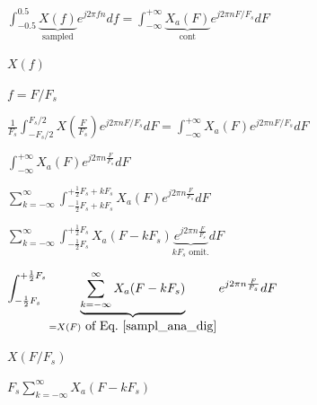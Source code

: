 \documentclass[12pt,a4paper]{article}
\def\lthtmlcheckvsize{\ifdim\ht\sizebox<\vsize 
  \ifdim\wd\sizebox<\hsize\expandafter\hfill\fi \expandafter\vfill
  \else\expandafter\vss\fi}%
\begin{document}
{\newpage\clearpage
{}%
$\displaystyle \int_{-0.5}^{0.5} \underbrace{X(f)}_{\mbox{sampled}} e^{j 2 \pi f n} df = 
\int_{-\infty}^{+\infty} \underbrace{X_a(F)}_{\mbox{cont}} e^{j 2\pi n F/F_s} dF
$%
\lthtmlindisplaymathZ
\lthtmlcheckvsize\clearpage}

{\newpage\clearpage
{}%
$X(f)$%
\lthtmlindisplaymathZ
\lthtmlcheckvsize\clearpage}

{\newpage\clearpage
{}%
$f=F/F_s$%
\lthtmlindisplaymathZ
\lthtmlcheckvsize\clearpage}

{\newpage\clearpage
{}%
$\displaystyle \frac{1}{F_s} \int_{-F_s/2}^{F_s/2} X(\frac{F}{F_s}) e^{j 2 \pi n F/F_s} dF
=
\int_{-\infty}^{+\infty} X_a(F) e^{j 2\pi n F/F_s} dF
$%
\lthtmlindisplaymathZ
\lthtmlcheckvsize\clearpage}

{\newpage\clearpage
{}%
$\displaystyle \int_{-\infty}^{+\infty} X_a(F) e^{j 2\pi n \frac{F}{F_s}} dF$%
\lthtmlindisplaymathZ
\lthtmlcheckvsize\clearpage}

{\newpage\clearpage
{}%
$\displaystyle \sum_{k=-\infty}^{\infty} \int_{-\frac{1}{2} F_s + k F_s}^{+\frac{1}{2} F_s + k F_s} X_a(F) e^{j2\pi n \frac{F}{F_s}} dF$%
\lthtmlindisplaymathZ
\lthtmlcheckvsize\clearpage}

{\newpage\clearpage
{}%
$\displaystyle \sum_{k=-\infty}^{\infty} \int_{-\frac{1}{2} F_s}^{+\frac{1}{2} F_s} X_a(F-k F_s) \underbrace{e^{j2\pi n\frac{F}{F_s}}}_{k F_s \mbox{ omit.}} dF$%
\lthtmlindisplaymathZ
\lthtmlcheckvsize\clearpage}

{\newpage\clearpage
{}%

$\displaystyle \int_{-\frac{1}{2} F_s}^{+\frac{1}{2} F_s} \underbrace{\sum_{k=-\infty}^{\infty} X_a(F-k F_s)}_{=X(F) \mbox{ of Eq.~\ref{sampl_ana_dig}}} e^{j2\pi n\frac{F}{F_s}} dF$%
\lthtmlindisplaymathZ
\lthtmlcheckvsize\clearpage}

{\newpage\clearpage
{}%
$\displaystyle X(F/F_s)$%
\lthtmlindisplaymathZ
\lthtmlcheckvsize\clearpage}

{\newpage\clearpage
{}%
$\displaystyle F_s \sum_{k=-\infty}^{\infty} X_a(F-kF_s)$%
\lthtmlindisplaymathZ
\lthtmlcheckvsize\clearpage}
\end{document}
